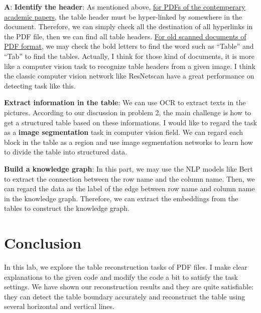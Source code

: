 \documentclass[12pt, a4paper]{article}
\theoremstyle{definition}
\begin{document}
\begin{enumerate}
	\textbf{A}: 
	\textbf{Identify the header}: As mentioned above, \underline{for PDFs of the contemperary academic papers}, the table header must be hyper-linked by somewhere in the document. Therefore, we can simply check all the destination of all hyperlinks in the PDF file, then we can find all table headers. \underline{For old scanned documents of PDF format}, we may check the bold letters to find the word such as ``Table'' and ``Tab'' to find the tables. Actually, I think for those kind of documents, it is more like a computer vision task to recognize table headers from a given image. I think the classic computer vision network like ResNets\footnotemark[1] can have a great performance on detecting task like this.


	\textbf{Extract information in the table}: We can use OCR to extract texts in the pictures. According to our discussion in problem 2, the main challenge is how to get a structured table based on these informations. I would like to regard the task as a \textbf{image segmentation} task in computer vision field. We can regard each block in the table as a region and use image segmentation networks to learn how to divide the table into structured data.

	\textbf{Build a knowledge graph}: In this part, we may use the NLP models like Bert \footnotemark[2] to extract the connection between the row name and the column name. Then, we can regard the data as the label of the edge between row name and column name in the knowledge graph. Therefore, we can extract the embeddings from the tables to construct the knowledge graph.
\end{enumerate}

\section{Conclusion}

In this lab, we explore the table reconstruction tasks of PDF files. I make clear explanations to the given code and modify the code a bit to satisfy the task settings. We have shown our reconstruction results and they are quite satisfiable: they can detect the table boundary accurately and reconstruct the table using several horizontal and vertical lines.
\end{document}
